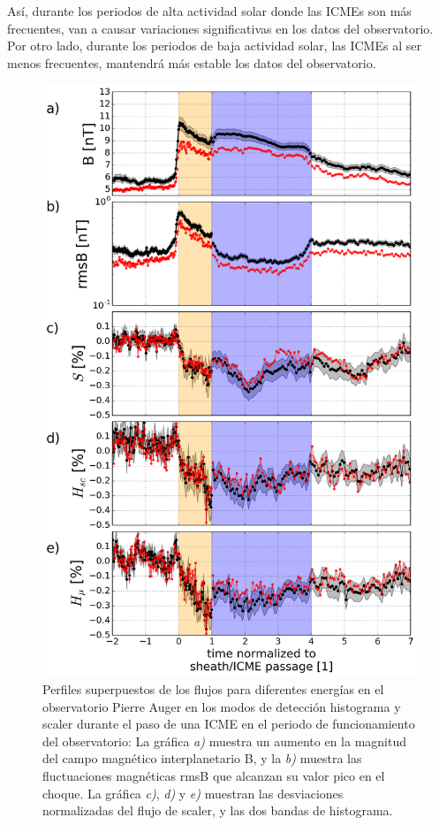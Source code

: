 Así, durante los periodos de alta actividad solar donde las ICMEs son más frecuentes, van a causar variaciones significativas en los datos del observatorio. Por otro lado, durante los periodos de baja actividad solar, las ICMEs al ser menos frecuentes, mantendrá más estable los datos del observatorio.



\begin{figure}
\centering
    \includegraphics[width=0.7\linewidth]{Figs/ICME_scaler.png}
    \caption{Perfiles superpuestos de los flujos para diferentes energías en el observatorio Pierre Auger en los modos de detección histograma y scaler durante el paso de una ICME en el periodo de funcionamiento del observatorio: La gráfica \textit{a)} muestra un aumento en la magnitud del campo magnético interplanetario B, y la \textit{b)} muestra las fluctuaciones magnéticas rmsB que alcanzan su valor pico en el choque. La gráfica \textit{c)}, \textit{d)} y \textit{e)} muestran las desviaciones normalizadas del flujo de scaler, y las dos bandas de histograma.}
    \label{fig:ICME_scaler}
\end{figure}



